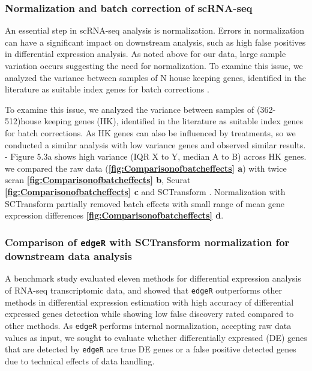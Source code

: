 \subsubsection{Normalization and batch correction of scRNA-seq}
 An essential step in scRNA-seq analysis is normalization. Errors in normalization can have a significant impact on downstream analysis, such as high false positives in differential expression analysis.
 As noted above for our data, large sample variation occurs suggesting the need for normalization. To examine this issue, we analyzed the variance between samples of N house keeping genes, identified in the literature as suitable index genes for batch corrections \cite{lin2019evaluating}.

 To examine this issue, we analyzed the variance between samples of (362-512)house keeping genes (HK), identified in the literature as suitable index genes for batch corrections. 
As HK genes can also be influenced by treatments, so we conducted a similar analysis with low variance genes and observed similar results.
- Figure 5.3a shows high variance (IQR X to Y, median A to B) across HK genes.
we compared the raw data (\textbf{\autoref{fig:Comparisonofbatcheffects} a}) with twice scran \cite{lun2016pooling} \textbf{\autoref{fig:Comparisonofbatcheffects} b}, Seurat \cite{butler2018integrating} \textbf{\autoref{fig:Comparisonofbatcheffects} c} and SCTransform \cite{hafemeister2019normalization}. Normalization with SCTransform partially removed batch effects with small range of mean gene expression differences \textbf{\autoref{fig:Comparisonofbatcheffects} d}.

\subsubsection{Comparison of \texttt{edgeR} with SCTransform normalization for downstream data analysis}
A benchmark study evaluated eleven methods \cite{soneson2013comparison} for differential expression analysis of RNA-seq transcriptomic data, and showed that \texttt{edgeR} outperforms other methods in differential expression estimation with high accuracy of differential expressed genes detection while showing low false discovery rated compared to other methods. 
As \texttt{edgeR} performs internal normalization, accepting raw data values as input, we sought to evaluate whether differentially expressed (DE) genes that are detected by \texttt{edgeR} are true DE genes or a false positive detected genes due to technical effects of data handling.

